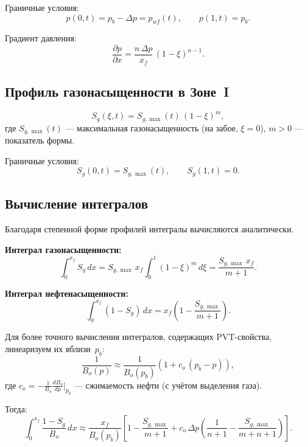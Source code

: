 \documentclass[12pt,a4paper]{article}
\begin{document}
Граничные условия:
\[
  p(0,t) = p_b - \Delta p = p_{wf}(t), \qquad p(1,t) = p_b.
\]

Градиент давления:
\begin{equation}\label{eq:dp_dx}
  \frac{\partial p}{\partial x}
  = \frac{n\,\Delta p}{x_f}\,(1-\xi)^{n-1}.
\end{equation}

\subsection{Профиль газонасыщенности в Зоне~I}

\begin{equation}\label{eq:saturation_profile}
  S_g(\xi, t) = S_{g,\max}(t)\,(1-\xi)^m,
\end{equation}
где $S_{g,\max}(t)$ --- максимальная газонасыщенность (на забое, $\xi=0$),
$m > 0$ --- показатель формы.

Граничные условия:
\[
  S_g(0,t) = S_{g,\max}(t), \qquad S_g(1,t) = 0.
\]

\subsection{Вычисление интегралов}

Благодаря степенной форме профилей интегралы вычисляются аналитически.

\textbf{Интеграл газонасыщенности:}
\begin{equation}\label{eq:Sg_integral}
  \int_0^{x_f} S_g\,dx
  = S_{g,\max}\,x_f \int_0^1 (1-\xi)^m\,d\xi
  = \frac{S_{g,\max}\,x_f}{m+1}.
\end{equation}

\textbf{Интеграл нефтенасыщенности:}
\begin{equation}\label{eq:So_integral}
  \int_0^{x_f}(1-S_g)\,dx
  = x_f\left(1 - \frac{S_{g,\max}}{m+1}\right).
\end{equation}

Для более точного вычисления интегралов, содержащих PVT-свойства,
линеаризуем их вблизи~$p_b$:
\begin{equation}\label{eq:Bo_linearize}
  \frac{1}{B_o(p)} \approx \frac{1}{B_o(p_b)}
  \left(1 + c_o\,(p_b - p)\right),
\end{equation}
где $c_o = -\frac{1}{B_o}\frac{dB_o}{dp}\big|_{p_b}$ ---
сжимаемость нефти (с учётом выделения газа).

Тогда:
\begin{equation}\label{eq:oil_volume_integral}
  \int_0^{x_f}\frac{1-S_g}{B_o}\,dx
  \approx \frac{x_f}{B_o(p_b)}\left[
    1 - \frac{S_{g,\max}}{m+1}
    + c_o\,\Delta p\left(\frac{1}{n+1}
    - \frac{S_{g,\max}}{m+n+1}\right)
  \right].
\end{equation}
\end{document}
